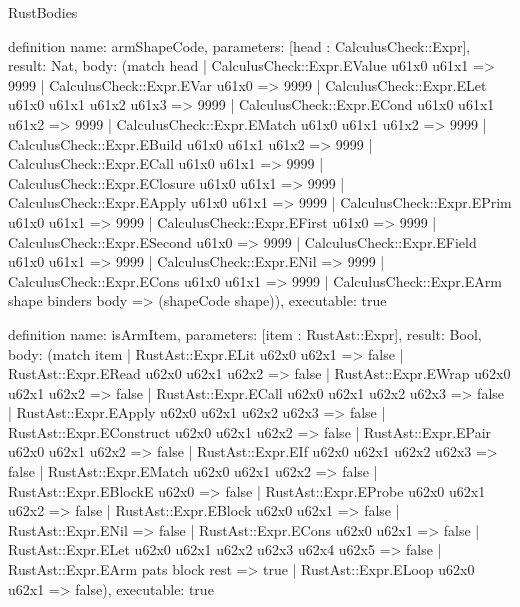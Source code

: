 \begin{lexlean}{RustBodies}
\begin{semanticmodule}
definition{
  name: armShapeCode,
  parameters: [head : CalculusCheck::Expr],
  result: Nat,
  body: (match head
    | CalculusCheck::Expr.EValue u61x0 u61x1 => 9999
    | CalculusCheck::Expr.EVar u61x0 => 9999
    | CalculusCheck::Expr.ELet u61x0 u61x1 u61x2 u61x3 => 9999
    | CalculusCheck::Expr.ECond u61x0 u61x1 u61x2 => 9999
    | CalculusCheck::Expr.EMatch u61x0 u61x1 u61x2 => 9999
    | CalculusCheck::Expr.EBuild u61x0 u61x1 u61x2 => 9999
    | CalculusCheck::Expr.ECall u61x0 u61x1 => 9999
    | CalculusCheck::Expr.EClosure u61x0 u61x1 => 9999
    | CalculusCheck::Expr.EApply u61x0 u61x1 => 9999
    | CalculusCheck::Expr.EPrim u61x0 u61x1 => 9999
    | CalculusCheck::Expr.EFirst u61x0 => 9999
    | CalculusCheck::Expr.ESecond u61x0 => 9999
    | CalculusCheck::Expr.EField u61x0 u61x1 => 9999
    | CalculusCheck::Expr.ENil => 9999
    | CalculusCheck::Expr.ECons u61x0 u61x1 => 9999
    | CalculusCheck::Expr.EArm shape binders body => (shapeCode shape)),
  executable: true
}

definition{
  name: isArmItem,
  parameters: [item : RustAst::Expr],
  result: Bool,
  body: (match item
    | RustAst::Expr.ELit u62x0 u62x1 => false
    | RustAst::Expr.ERead u62x0 u62x1 u62x2 => false
    | RustAst::Expr.EWrap u62x0 u62x1 u62x2 => false
    | RustAst::Expr.ECall u62x0 u62x1 u62x2 u62x3 => false
    | RustAst::Expr.EApply u62x0 u62x1 u62x2 u62x3 => false
    | RustAst::Expr.EConstruct u62x0 u62x1 u62x2 => false
    | RustAst::Expr.EPair u62x0 u62x1 u62x2 => false
    | RustAst::Expr.EIf u62x0 u62x1 u62x2 u62x3 => false
    | RustAst::Expr.EMatch u62x0 u62x1 u62x2 => false
    | RustAst::Expr.EBlockE u62x0 => false
    | RustAst::Expr.EProbe u62x0 u62x1 u62x2 => false
    | RustAst::Expr.EBlock u62x0 u62x1 => false
    | RustAst::Expr.ENil => false
    | RustAst::Expr.ECons u62x0 u62x1 => false
    | RustAst::Expr.ELet u62x0 u62x1 u62x2 u62x3 u62x4 u62x5 => false
    | RustAst::Expr.EArm pats block rest => true
    | RustAst::Expr.ELoop u62x0 u62x1 => false),
  executable: true
}


\end{semanticmodule}
\end{lexlean}
